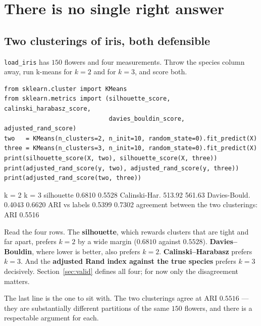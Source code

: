 \documentclass[11pt]{article}
\begin{document}
\notesources{\AMLUnitVIISources}

\section{There is no single right answer}
\label{sec:noright}

\subsection{Two clusterings of iris, both defensible}
\label{sec:twoiris}

\texttt{load\_iris} has $150$ flowers and four measurements. Throw the species
column away, run k-means for $k = 2$ and for $k = 3$, and score both.

\begin{lstlisting}
from sklearn.cluster import KMeans
from sklearn.metrics import (silhouette_score, calinski_harabasz_score,
                             davies_bouldin_score, adjusted_rand_score)
two   = KMeans(n_clusters=2, n_init=10, random_state=0).fit_predict(X)
three = KMeans(n_clusters=3, n_init=10, random_state=0).fit_predict(X)
print(silhouette_score(X, two), silhouette_score(X, three))
print(adjusted_rand_score(y, two), adjusted_rand_score(y, three))
print(adjusted_rand_score(two, three))
\end{lstlisting}
\begin{codeout}
                    k = 2      k = 3
silhouette         0.6810     0.5528
Calinski-Har.      513.92     561.63
Davies-Bould.      0.4043     0.6620
ARI vs labels      0.5399     0.7302
agreement between the two clusterings: ARI 0.5516
\end{codeout}

Read the four rows. The \textbf{silhouette}, which rewards clusters that are
tight and far apart, prefers $k = 2$ by a wide margin ($0.6810$ against
$0.5528$). \textbf{Davies--Bouldin}, where lower is better, also prefers
$k = 2$. \textbf{Calinski--Harabasz} prefers $k = 3$. And the
\textbf{adjusted Rand index against the true species} prefers $k = 3$
decisively. Section~\ref{sec:valid} defines all four; for now only the
disagreement matters.

The last line is the one to sit with. The two clusterings agree at ARI
$\mathbf{0.5516}$ --- they are substantially different partitions of the same
$150$ flowers, and there is a respectable argument for each.
\end{document}
